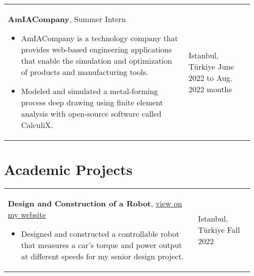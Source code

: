 \documentclass[10pt, a4paper]{article}
\newenvironment{highlights}{
        \begin{itemize}[
                topsep=0pt,
                parsep=0.10 cm,
                partopsep=0pt,
                itemsep=0pt,
                after=\vspace{-1\baselineskip},
                leftmargin=0.4 cm + 3pt
            ]
    }{
        \end{itemize}
    } %
\let\hrefWithoutArrow\href
\renewcommand{\href}[2]{\hrefWithoutArrow{#1}{#2 \raisebox{.15ex}{\footnotesize \faExternalLink*}}}
\begin{document}
        \vspace{0.2 cm}
        \begin{tabularx}{ cm-0.13cm}{K{0.2 cm} R{3.6 cm}}
            \textbf{AmIACompany}, Summer Intern
            \vspace{0.10 cm}
            \begin{highlights}
                \item AmIACompany is a technology company that provides web-based engineering applications that enable the simulation and optimization of products and manufacturing tools. 
                \item Modeled and simulated a metal-forming process deep drawing using finite element analysis with open-source software called CalculiX. \hspace*{-0.2cm}
            \end{highlights}
        &
            Istanbul, Türkiye \newline
            June 2022 to Aug. 2022  months
        \end{tabularx}



    \section{Academic Projects}
    
        \begin{tabularx}{ cm-0.13cm}{K{0.2 cm} R{3.6 cm}}
            \textbf{Design and Construction of a Robot}, \href{https://example.com/}{view on my website}
            \vspace{0.10 cm}
            \begin{highlights}
                \item Designed and constructed a controllable robot that measures a car's torque and power output at different speeds for my senior design project. \hspace*{-0.2cm}
            \end{highlights}
        &
            Istanbul, Türkiye \newline
            Fall 2022
        \end{tabularx}
\end{document}

